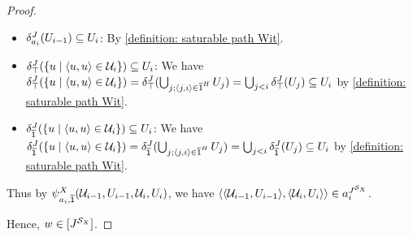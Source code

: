 \begin{proof}
\begin{itemize}
\begin{itemize}
\begin{itemize}
                                   By $\tuple{j, i} \in \com{\id}^{\graph[2]}$ iff $j < i$ iff $\tuple{j, i-1} \in \com{\id}^{\graph[2]} \lor \tuple{j, i-1} \in \id^{\graph[2]}$, for all $j$.
                                   (Intuitively, $\mathcal{U}_{i-1}$ corresponds to the case $\tuple{j, i-1} \in \com{\id}^{\graph[2]}$ and $U_{i-1}^2$ corresponds to the case $\tuple{j, i-1} \in \id^{\graph[2]}$.)
                                   \item $\delta_{a_{i}}^{\graph[3]}(U_{i-1}) \subseteq U_{i}$:
                                   By \ref{definition: saturable path Wit}.
                                   \item $\delta_{\top}^{\graph[3]}(\set{u \mid \tuple{u, u} \in \mathcal{U}_{i}}) \subseteq U_{i}$:
                                   We have
                                   $\delta_{\top}^{\graph[3]}(\set{u \mid \tuple{u, u} \in \mathcal{U}_{i}})
                                   = \delta_{\top}^{\graph[3]}(\bigcup_{j; \tuple{j, i} \in \com{\id}^{\graph[2]}} U_{j})
                                   = \bigcup_{j < i} \delta_{\top}^{\graph[3]}(U_{j}) \subseteq U_{i}$ by \ref{definition: saturable path Wit}.
                                   \item $\delta_{\com{\id}}^{\graph[3]}(\set{u \mid \tuple{u, u} \in \mathcal{U}_{i}}) \subseteq U_{i}$:
                                   We have
                                   $\delta_{\com{\id}}^{\graph[3]}(\set{u \mid \tuple{u, u} \in \mathcal{U}_{i}})
                                   = \delta_{\com{\id}}^{\graph[3]}(\bigcup_{j; \tuple{j, i} \in \com{\id}^{\graph[2]}} U_{j})
                                   = \bigcup_{j < i} \delta_{\com{\id}}^{\graph[3]}(U_{j}) \subseteq U_{i}$ by \ref{definition: saturable path Wit}.
                           \end{itemize}
                                 Thus by $\fml[2]_{a_{i}, \com{\id}}^{\Aset}(\mathcal{U}_{i-1}, U_{i-1}, \mathcal{U}_{i}, U_{i})$, we have $\tuple{\tuple{\mathcal{U}_{i-1}, U_{i-1}}, \tuple{\mathcal{U}_{i}, U_{i}}} \in a_{i}^{\graph[3]^{\FillS_{\Aset}}}$.
                    \end{itemize}
       \end{itemize}
       Hence, $\word \in \ljump{\graph[3]^{\FillS_{\Aset}}}$.


\end{proof}
